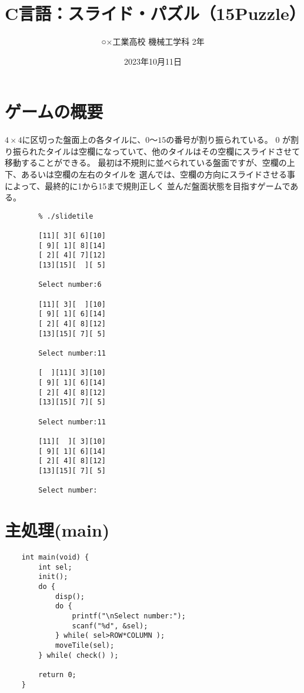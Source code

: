 \documentclass[uplatex,a4paper,11pt,oneside,openany]{jsarticle}
\begin{document}
	\title{C言語：スライド・パズル（15Puzzle）}
	\author{○×工業高校 機械工学科 2年}
	\date{2023年10月11日}
	\maketitle
	\pagestyle{empty}

\newpage

\section{ゲームの概要}

$4 \times 4$に区切った盤面上の各タイルに、$0〜15$の番号が割り振られている。
0 が割り振られたタイルは空欄になっていて、他のタイルはその空欄にスライドさせて
移動することができる。
最初は不規則に並べられている盤面ですが、空欄の上下、あるいは空欄の左右のタイルを
選んでは、空欄の方向にスライドさせる事によって、最終的に1から15まで規則正しく
並んだ盤面状態を目指すゲームである。

\begin{spacing}{0.74}
	\begin{verbatim}
		% ./slidetile
		
		[11][ 3][ 6][10]
		[ 9][ 1][ 8][14]
		[ 2][ 4][ 7][12]
		[13][15][  ][ 5]
		
		Select number:6
		
		[11][ 3][  ][10]
		[ 9][ 1][ 6][14]
		[ 2][ 4][ 8][12]
		[13][15][ 7][ 5]
		
		Select number:11
		
		[  ][11][ 3][10]
		[ 9][ 1][ 6][14]
		[ 2][ 4][ 8][12]
		[13][15][ 7][ 5]
		
		Select number:11
		
		[11][  ][ 3][10]
		[ 9][ 1][ 6][14]
		[ 2][ 4][ 8][12]
		[13][15][ 7][ 5]
		
		Select number:
	\end{verbatim}
\end{spacing}

\newpage

\section{主処理(main)}

\begin{lstlisting}
	int main(void) {
		int sel;
		init();
		do {
			disp();
			do {
				printf("\nSelect number:");
				scanf("%d", &sel);
			} while( sel>ROW*COLUMN );
			moveTile(sel);
		} while( check() );
		
		return 0;
	}
\end{lstlisting}
\end{document}
